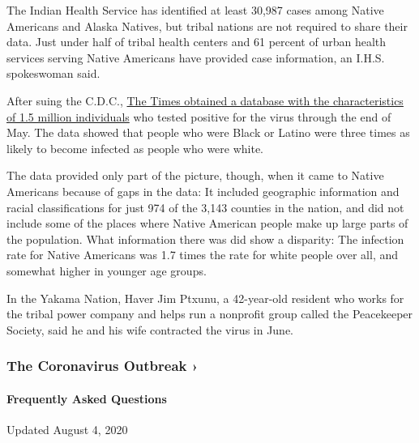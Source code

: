 The Indian Health Service has identified at least 30,987 cases among
Native Americans and Alaska Natives, but tribal nations are not required
to share their data. Just under half of tribal health centers and 61
percent of urban health services serving Native Americans have provided
case information, an I.H.S. spokeswoman said.

After suing the C.D.C.,
\href{https://www.nytimes.com/interactive/2020/07/05/us/coronavirus-latinos-african-americans-cdc-data.html}{The
Times obtained a database with the characteristics of 1.5 million
individuals} who tested positive for the virus through the end of May.
The data showed that people who were Black or Latino were three times as
likely to become infected as people who were white.

The data provided only part of the picture, though, when it came to
Native Americans because of gaps in the data: It included geographic
information and racial classifications for just 974 of the 3,143
counties in the nation, and did not include some of the places where
Native American people make up large parts of the population. What
information there was did show a disparity: The infection rate for
Native Americans was 1.7 times the rate for white people over all, and
somewhat higher in younger age groups.

In the Yakama Nation, Haver Jim Ptxunu, a 42-year-old resident who works
for the tribal power company and helps run a nonprofit group called the
Peacekeeper Society, said he and his wife contracted the virus in June.

\href{https://www.nytimes.com/news-event/coronavirus?action=click\&pgtype=Article\&state=default\&region=MAIN_CONTENT_3\&context=storylines_faq}{}

\hypertarget{the-coronavirus-outbreak-}{%
\subsubsection{The Coronavirus Outbreak
›}\label{the-coronavirus-outbreak-}}

\hypertarget{frequently-asked-questions}{%
\paragraph{Frequently Asked
Questions}\label{frequently-asked-questions}}

Updated August 4, 2020

